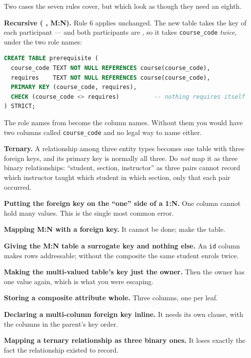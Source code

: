 \begin{conceptbox}
Two cases the seven rules cover, but which look as though they need an eighth.

\medskip
\textbf{Recursive (  , M:N).} Rule 6
applies unchanged. The new table takes the key of each participant --- and
both participants are , so it takes \texttt{course\_code}
\emph{twice}, under the two role names:

\begin{lstlisting}[language=sql]
CREATE TABLE prerequisite (
  course_code TEXT NOT NULL REFERENCES course(course_code),
  requires    TEXT NOT NULL REFERENCES course(course_code),
  PRIMARY KEY (course_code, requires),
  CHECK (course_code <> requires)          -- nothing requires itself
) STRICT;
\end{lstlisting}

The role names from  become the column names. Without them you
would have two columns called \texttt{course\_code} and no legal way to name
either.

\medskip
\textbf{Ternary.} A relationship among three entity types becomes one table
with three foreign keys, and its primary key is normally all three. Do
\emph{not} map it as three binary relationships: ``student, section,
instructor'' as three pairs cannot record which instructor taught which
student in which section, only that each pair occurred.
\end{conceptbox}

\begin{pitfall}
\begin{tight}
  \item \textbf{Putting the foreign key on the ``one'' side of a 1:N.} One
        column cannot hold many values. This is the single most common error.
  \item \textbf{Mapping M:N with a foreign key.} It cannot be done; make the
        table.
  \item \textbf{Giving the M:N table a surrogate key and nothing else.} An
        \texttt{id} column makes rows addressable; without the composite
         the same student enrols twice.
  \item \textbf{Making the multi-valued table's key just the owner.} Then the
        owner has one value again, which is what you were escaping.
  \item \textbf{Storing a composite attribute whole.} Three columns, one per
        leaf.
  \item \textbf{Declaring a multi-column foreign key inline.} It needs its own
         clause, with the columns in the parent's key order.
  \item \textbf{Mapping a ternary relationship as three binary ones.} It loses
        exactly the fact the relationship existed to record.
\end{tight}
\end{pitfall}

